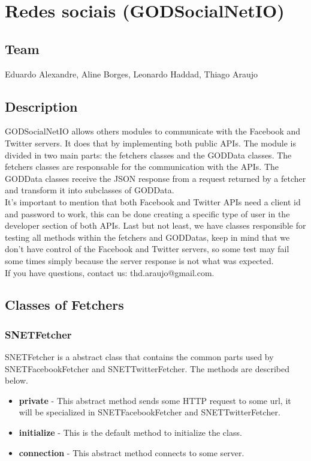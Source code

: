 \section{Redes sociais (GODSocialNetIO)}
\label{sec-1}
\subsection{Team}
\label{sec-1-1}

  Eduardo Alexandre, Aline Borges, Leonardo Haddad, Thiago Araujo
\subsection{Description}
\label{sec-1-2}

  GODSocialNetIO allows others modules to communicate with the Facebook and Twitter servers. It does that by implementing both public APIs.
  The module is divided in two main parts: the fetchers classes and the GODData classes. The fetchers classes are responsable for the communication with the APIs.
  The GODData classes receive the JSON response from a request returned by a fetcher and transform it into subclasses of GODData.\\
  
  It's important to mention that both Facebook and Twitter APIs need a client id and password to work, this can be done creating a specific type of user in the developer section of both APIs.
  Last but not least, we have classes responsible for testing all methods within the fetchers and GODDatas, keep in mind that we don't have control of the Facebook and Twitter servers, so some test may fail some times simply because the server response is not what was expected.\\
  
  If you have questions, contact us: thd.araujo@gmail.com.

\subsection{Classes of Fetchers}
\label{sec-1-4}
\subsubsection{SNETFetcher}
\label{sec-1-4-1}
SNETFetcher is a abstract class that contains the common parts used by SNETFacebookFetcher and SNETTwitterFetcher. The methods are described below.
\begin{itemize}
\item \textbf{private} - This abstract method sends some HTTP request to some url, it will be specialized in SNETFacebookFetcher and SNETTwitterFetcher.
\item \textbf{initialize} - This is the default method to initialize the class.
\item \textbf{connection} - This abstract method connects to some server.
\end{itemize} %


